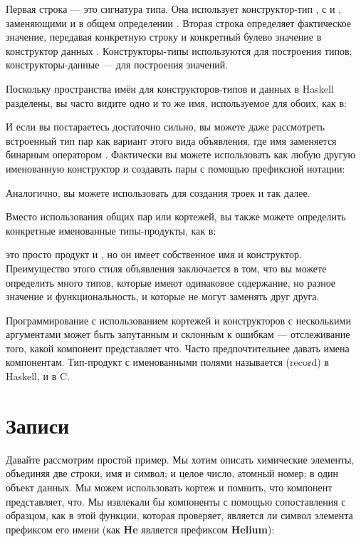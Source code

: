 Первая строка — это сигнатура типа. Она использует конструктор-тип , с  и , заменяющими  и  в общем определении . Вторая строка определяет фактическое значение, передавая конкретную строку и конкретный булево значение в конструктор данных . Конструкторы-типы используются для построения типов; конструкторы-данные — для построения значений.

Поскольку пространства имён для конструкторов-типов и данных в Haskell разделены, вы часто видите одно и то же имя, используемое для обоих, как в:

И если вы постараетесь достаточно сильно, вы можете даже рассмотреть встроенный тип пар как вариант этого вида объявления, где имя  заменяется бинарным оператором \code{(,)}. Фактически вы можете использовать \code{(,)} как любую другую именованную конструктор и создавать пары с помощью префиксной нотации:

Аналогично, вы можете использовать \code{(,,)} для создания троек и так далее.

Вместо использования общих пар или кортежей, вы также можете определить конкретные именованные типы-продукты, как в:

это просто продукт  и , но он имеет собственное имя и конструктор. Преимущество этого стиля объявления заключается в том, что вы можете определить много типов, которые имеют одинаковое содержание, но разное значение и функциональность, и которые не могут заменять друг друга.

Программирование с использованием кортежей и конструкторов с несколькими аргументами может быть запутанным и склонным к ошибкам — отслеживание того, какой компонент представляет что. Часто предпочтительнее давать имена компонентам. Тип-продукт с именованными полями называется  (record) в Haskell, и  в C.

\section{Записи}

Давайте рассмотрим простой пример. Мы хотим описать химические элементы, объединяя две строки, имя и символ; и целое число, атомный номер; в один объект данных. Мы можем использовать кортеж  и помнить, что компонент представляет, что. Мы извлекали бы компоненты с помощью сопоставления с образцом, как в этой функции, которая проверяет, является ли символ элемента префиксом его имени (как \textbf{He} является префиксом \textbf{Helium}):

